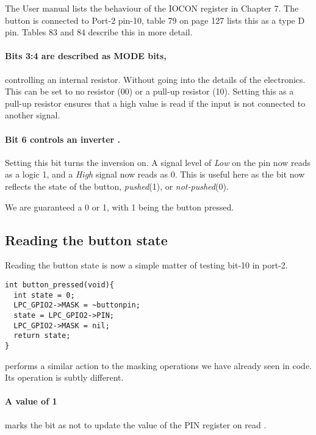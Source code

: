 \documentclass[a4paper]{tufte-handout}
\begin{document}
The User manual \citep{lpc4088} lists the behaviour of the IOCON
register in Chapter 7.  The button is connected to Port-2 pin-10,
table 79 on page 127 lists this as a type D pin.  Tables 83 and 84
describe this in more detail.

\paragraph{Bits 3:4 are described as MODE bits,} controlling an internal
resistor.  Without going into the details of the electronics.  This
can be set to no resistor (00) or a pull-up resistor (10).  Setting
this as a pull-up resistor ensures that a high value is read if the
input is not connected to another signal.
 

\paragraph{Bit 6 controls an inverter \citep[7.3.4]{lpc4088}.}
Setting this bit turns the inversion on.  A signal level of \emph{Low}
on the pin now reads as a logic 1, and a \emph{High} signal now reads
as 0.   This is useful here as the bit now reflects the state of the
button, \emph{pushed}(1), or \emph{not-pushed}(0).
 
We are guaranteed a 0 or 1, with 1 being the button pressed.

\subsection{Reading the button state}
Reading the button state is now a simple matter of testing bit-10 in
port-2.
\begin{verbatim}
int button_pressed(void){
  int state = 0;
  LPC_GPIO2->MASK = ~buttonpin;
  state = LPC_GPIO2->PIN;
  LPC_GPIO2->MASK = nil;
  return state;
}
\end{verbatim}
 performs a similar action to
the masking operations we have already seen in code.  Its operation is
subtly different.
\paragraph{A value of 1} marks the bit as not to update the value of
the PIN register on read \citep[8.5.1.2]{lpc4088}.
\end{document}
